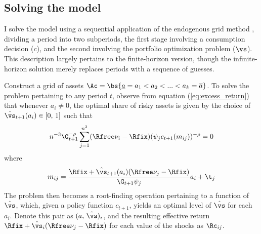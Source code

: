 \subsection{Solving the model}\label{app:seq_egm}

I solve the model using a sequential application of the endogenous grid method \citep{Carroll2006}, dividing a period into two subperiods, the first stage involving a consumption decision ($c$), and the second involving the portfolio optimization problem ($\vs$). This description largely pertains to the finite-horizon version, though the infinite-horizon solution merely replaces periods with a sequence of guesses.

Construct a grid of assets $\Ac = \bs{\underline{a} = a_1 < a_2 < ... < a_k = \overline{a}}$. To solve the problem pertaining to any period $t$, observe from equation (\ref{eq:excess_return}) that whenever $a_i \neq 0$, the optimal share of risky assets is given by the choice of $\hat{\vs}_{t+1}(a_i) \in [0,\,1]$ such that
\begin{equation}\label{eq:kappa}
n^{-3}\G_{t+1}^{-\rho}\sum_{j=1}^{n^3}(\Rfree\nu_i - \Rfix)(\psi_{j}c_{t+1}(m_{ij}))^{-\rho} = 0
\end{equation}
where
\[
m_{ij} = \frac{\Rfix + \hat{\vs}_{t+1}(a_i)(\Rfree\nu_j - \Rfix)}{\G_{t+1}\psi_{j}}a_i + \t_j
\]
The problem then becomes a root-finding operation pertaining to a function of $\hat{\vs}$, which, given a policy function $c_{t+1}$, yields an optimal level of $\hat{\vs}$ for each $a_i$. Denote this pair as $(a,\,\hat{\vs})_{i}$, and the resulting effective return $\Rfix + \hat{\vs}_{i}(\Rfree\nu_{j} - \Rfix)$ for each value of the shocks as $\Rc_{ij}$.


